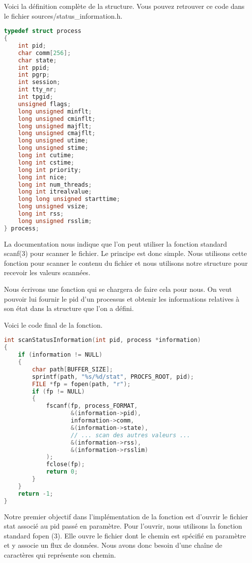 \pagebreak
Voici la définition complète de la structure. Vous pouvez retrouver ce code dans le fichier sources/status\_information.h.

\begin{lstlisting}[frame=single, language=c]
typedef struct process
{
    int pid;
    char comm[256];
    char state;
    int ppid;
    int pgrp;
    int session;
    int tty_nr;
    int tpgid;
    unsigned flags;
    long unsigned minflt;
    long unsigned cminflt;
    long unsigned majflt;
    long unsigned cmajflt;
    long unsigned utime;
    long unsigned stime;
    long int cutime;
    long int cstime;
    long int priority;
    long int nice;
    long int num_threads;
    long int itrealvalue;
    long long unsigned starttime;
    long unsigned vsize;
    long int rss;
    long unsigned rsslim;
} process;
\end{lstlisting}

La documentation nous indique que l’on peut utiliser la fonction standard scanf(3) pour scanner le fichier. Le principe est donc simple. Nous utilisons cette fonction pour scanner le contenu du fichier et nous utilisons notre structure pour recevoir les valeurs scannées. 

Nous écrivons une fonction qui se chargera de faire cela pour nous. On veut pouvoir lui fournir le pid d’un processus et obtenir les informations relatives à son état dans la structure que l'on a défini. 

Voici le code final de la fonction. 
\begin{lstlisting}[frame=single, language=c]
int scanStatusInformation(int pid, process *information)
{
    if (information != NULL)
    {
        char path[BUFFER_SIZE];
        sprintf(path, "%s/%d/stat", PROCFS_ROOT, pid);
        FILE *fp = fopen(path, "r");
        if (fp != NULL)
        {
            fscanf(fp, process_FORMAT,
                   &(information->pid),
                   information->comm,
                   &(information->state),
                   // ... scan des autres valeurs ...
                   &(information->rss),
                   &(information->rsslim)
            );
            fclose(fp);
            return 0;
        }
    }
    return -1;
}
\end{lstlisting}

Notre premier objectif dans l'implémentation de la fonction est d'ouvrir le fichier stat associé au pid passé en paramètre. Pour l'ouvrir, nous utilisons la fonction standard fopen (3). Elle ouvre le fichier dont le chemin est spécifié en paramètre et y associe un flux de données. Nous avons donc besoin d'une chaîne de caractères qui représente son chemin.

